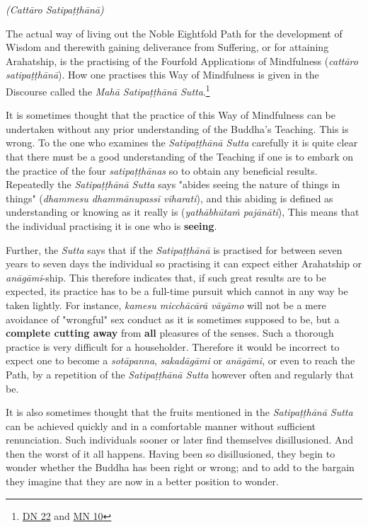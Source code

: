\emph{(Cattāro Satipaṭṭhānā)}

\protect\hypertarget{start}{}{}The actual way of living out the Noble Eightfold Path for the development of Wisdom and therewith gaining deliverance from Suffering, or for attaining Arahatship, is the practising of the Fourfold Applications of Mindfulness (\emph{cattāro satipaṭṭhānā}). How one practises this Way of Mindfulness is given in the Discourse called the \emph{Mahā Satipaṭṭhānā Sutta}.\footnote{\href{https://suttacentral.net/dn22/en/sujato}{DN 22} and \href{https://suttacentral.net/mn10/en/sujato}{MN 10}}

It is sometimes thought that the practice of this Way of Mindfulness can be undertaken without any prior understanding of the Buddha's Teaching. This is wrong. To the one who examines the \emph{Satipaṭṭhānā Sutta} carefully it is quite clear that there must be a good understanding of the Teaching if one is to embark on the practice of the four \emph{satipaṭṭhānas} so to obtain any beneficial results. Repeatedly the \emph{Satipaṭṭhānā Sutta} says "abides seeing the nature of things in things" (\emph{dhammesu dhammānupassī viharati}), and this abiding is defined as understanding or knowing as it really is (\emph{yathābhūtaṁ pajānāti}), This means that the individual practising it is one who is \textbf{seeing}.

Further, the \emph{Sutta} says that if the \emph{Satipaṭṭhānā} is practised for between seven years to seven days the individual so practising it can expect either Arahatship or \emph{anāgāmi}-ship. This therefore indicates that, if such great results are to be expected, its practice has to be a full-time pursuit which cannot in any way be taken lightly. For instance, \emph{kamesu micchācārā vāyāmo} will not be a mere avoidance of "wrongful" sex conduct as it is sometimes supposed to be, but a \textbf{complete cutting away} from \textbf{all} pleasures of the senses. Such a thorough practice is very difficult for a householder. Therefore it would be incorrect to expect one to become a \emph{sotāpanna}, \emph{sakadāgāmi} or \emph{anāgāmi}, or even to reach the Path, by a repetition of the \emph{Satipaṭṭhānā Sutta} however often and regularly that be.

It is also sometimes thought that the fruits mentioned in the \emph{Satipaṭṭhānā Sutta} can be achieved quickly and in a comfortable manner without sufficient renunciation. Such individuals sooner or later find themselves disillusioned. And then the worst of it all happens. Having been so disillusioned, they begin to wonder whether the Buddha has been right or wrong; and to add to the bargain they imagine that they are now in a better position to wonder.

